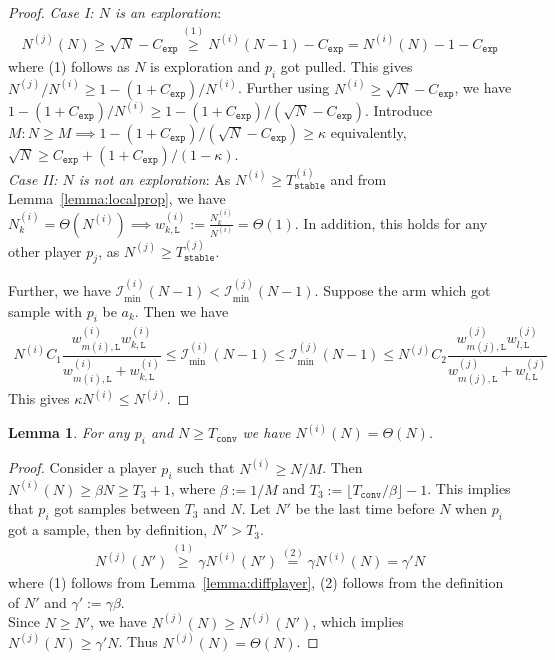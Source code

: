 \documentclass{article}
\newtheorem{lemma}[theorem]{Lemma}
\begin{document}
 \begin{proof}
\textit{Case I: $N$ is an exploration}: 
\begin{align*}
    N^{(j)}(N) \geq  \sqrt{N}-C_{\texttt{exp}} \overset{(1)}{\geq} N^{(i)}(N-1)-C_{\texttt{exp}} = N^{(i)}(N)-1-C_{\texttt{exp}}
\end{align*}
where (1) follows as $N$ is exploration and $p_i$ got pulled. This gives $N^{(j)}/N^{(i)}\geq 1- (1+C_{\texttt{exp}})/N^{(i)}$.
Further using $N^{(i)}\geq  \sqrt{N}-C_{\texttt{exp}}$, we have $1- (1+C_{\texttt{exp}})/N^{(i)}\geq 1-(1+C_{\texttt{exp}})/(  \sqrt{N}-C_{\texttt{exp}})$. Introduce $M: N\geq M\implies  1-(1+C_{\texttt{exp}})/( \sqrt{N}-C_{\texttt{exp}})\geq \kappa$ equivalently, $ \sqrt{N} \geq C_{\texttt{exp}}+(1+C_{\texttt{exp}})/(1-\kappa)$. \\
\textit{Case II: $N$ is not an exploration}: As $N^{(i)}\geq  T_{\texttt{stable}}^{(i)}$ and from Lemma~\ref{lemma:localprop}, we have $N^{(i)}_k=\Theta(N^{(i)})\implies w^{(i)}_{k,\texttt{L}}:=\frac{N^{(i)}_k}{N^{(i)}}=\Theta(1)$. In addition, this holds for any other player $p_j$, as $N^{(j)}\geq T_{\texttt{stable}}^{(j)}$.

Further, we have $\mathcal{I}_{\min}^{(i)}(N-1)<\mathcal{I}_{\min}^{(j)}(N-1)$. Suppose the arm which got sample with $p_i$ be $a_k$. Then we have
    \begin{align*}
        N^{(i)}C_1\dfrac{w^{(i)}_{m(i),\texttt{L}}w^{(i)}_{k,\texttt{L}}}{w^{(i)}_{m(i),\texttt{L}}+w^{(i)}_{k,\texttt{L}}} \leq \mathcal{I}_{\min}^{(i)}(N-1)\leq \mathcal{I}_{\min}^{(j)}(N-1)\leq   N^{(j)}C_2\dfrac{w^{(j)}_{m(j),\texttt{L}}w^{(j)}_{l,\texttt{L}}}{w^{(j)}_{m(j),\texttt{L}}+w^{(j)}_{l,\texttt{L}}} 
    \end{align*}
    This gives $\kappa N^{(i)}\leq  N^{(j)}$.
\end{proof}



\begin{lemma}
    For any $p_i$ and $N\geq T_{\texttt{conv}}$ we have $N^{(i)}(N)=\Theta(N)$.
    \label{lemma:globaltime}
\end{lemma}
\begin{proof}
    Consider a player $p_i$ such that $N^{(i)}\geq N/M$. Then $N^{(i)}(N)\geq \beta N\geq T_3+1$, where $\beta:=1/M$ and $T_3:=\lfloor T_{\texttt{conv}}/\beta\rfloor-1$. This implies that $p_i$ got samples between $T_3$ and $N$. Let $N'$ be the last time before $N$ when $p_i$ got a sample, then by definition, $N'>T_3$.
    \begin{align*}
        N^{(j)}(N')\overset{(1)}{\geq} \gamma  N^{(i)}(N') \overset{(2)}{=} \gamma N^{(i)}(N) = \gamma' N
    \end{align*}
    where (1) follows from Lemma~\ref{lemma:diffplayer}, (2) follows from the definition of $N'$ and $\gamma':=\gamma\beta$.\\
    Since $N\geq N'$, we have $N^{(j)}(N)\geq N^{(j)}(N')$, which implies $ N^{(j)}(N)\geq \gamma'N$. Thus $ N^{(j)}(N)=\Theta(N)$. 
\end{proof}
\end{document}
